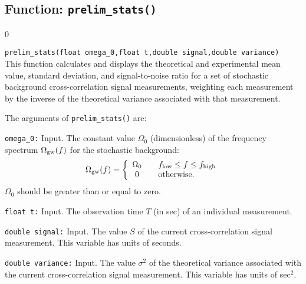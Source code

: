 \subsection{Function: {\tt prelim\_stats()}}
\label{subsec:prelim_stats}
\setcounter{equation}0

{\tt prelim\_stats(float omega\_0,float t,double signal,double variance)}\\
%
This function calculates and displays the theoretical and 
experimental mean value, standard deviation, and signal-to-noise ratio 
for a set of stochastic background cross-correlation signal measurements,
weighting each measurement by the inverse of the theoretical
variance associated with that measurement.

The arguments of {\tt prelim\_stats()} are:
\begin{description}
%
\item{\tt omega\_0:} Input.  
The constant value $\Omega_0$ (dimensionless) of the frequency 
spectrum $\Omega_{\rm gw}(f)$ for the stochastic background:
%
\[
\Omega_{\rm gw}(f)=\left\{
\begin{array}{cl}
\Omega_0 & \quad f_{\rm low}\le f \le f_{\rm high}\\
0        & \quad {\rm otherwise.}
\end{array}
\right.
\]
%
$\Omega_0$ should be greater than or equal to zero.
%
\item{\tt float t:} Input.
The observation time $T$ (in sec) of an individual measurement.
%
\item{\tt double signal:} Input.
The value $S$ of the current cross-correlation signal measurement.
This variable has units of seconds.
%
\item{\tt double variance:} Input.
The value $\sigma^2$ of the theoretical variance associated with 
the current cross-correlation signal measurement.
This variable has units of sec$^2$.
\end{description}

